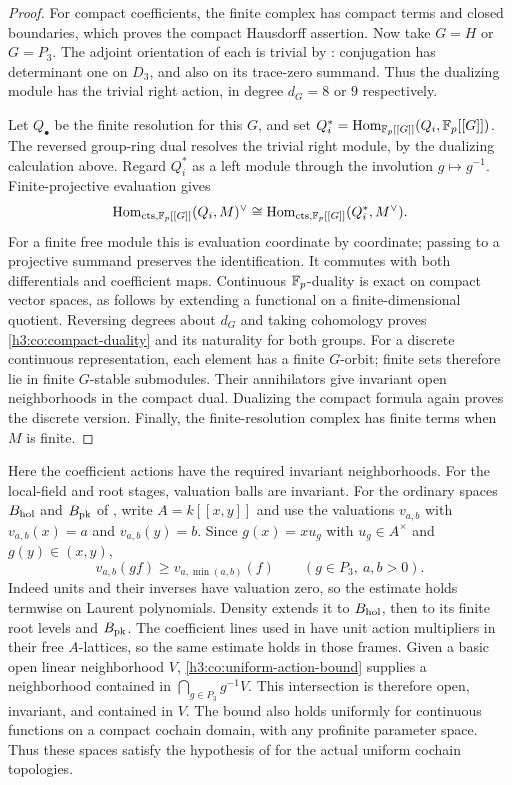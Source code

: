 \begin{proof}
For compact coefficients, the finite complex has compact terms and
closed boundaries, which proves the compact Hausdorff assertion.
Now take $G=H$ or $G=P_3$.  The adjoint orientation of each is trivial
by : conjugation has determinant one on
$D_3$, and also on its trace-zero summand.  Thus the dualizing module
has the trivial right action, in degree $d_G=8$ or $9$ respectively.

Let $Q_\bullet$ be the finite resolution for this $G$, and set
$Q_i^*=\operatorname{Hom}_{\mathbb F_p[[G]]}(Q_i,\mathbb F_p[[G]])$.
The reversed group-ring dual resolves the trivial right module, by
the dualizing calculation above.  Regard $Q_i^*$ as a left module
through the involution $g\mapsto g^{-1}$.  Finite-projective evaluation
gives
\[
 \operatorname{Hom}_{\mathrm{cts},\mathbb F_p[[G]]}(Q_i,M)^\vee
 \cong
 \operatorname{Hom}_{\mathrm{cts},\mathbb F_p[[G]]}(Q_i^*,M^\vee).
\]
For a finite free module this is evaluation coordinate by coordinate;
passing to a projective summand preserves the identification.  It
commutes with both differentials and coefficient maps.  Continuous
$\mathbb F_p$-duality is exact on compact vector spaces, as follows by extending
a functional on a finite-dimensional quotient.  Reversing degrees about
$d_G$ and taking cohomology proves \eqref{h3:co:compact-duality} and its
naturality for both groups.  For a discrete continuous representation,
each element has a finite $G$-orbit; finite sets therefore lie in finite
$G$-stable submodules.  Their annihilators give invariant open
neighborhoods in the compact dual.  Dualizing the compact formula again
proves the discrete version.  Finally, the finite-resolution complex
has finite terms when $M$ is finite.
\end{proof}

Here the coefficient actions have the required invariant neighborhoods.
For the local-field and root stages, valuation balls are invariant.
For the ordinary spaces $B_{\mathrm{hol}}$ and $B_{\mathrm{pk}}$ of
, write $A=k[[x,y]]$ and use the valuations
$v_{a,b}$ with $v_{a,b}(x)=a$ and $v_{a,b}(y)=b$.  Since
$g(x)=xu_g$ with $u_g\in A^\times$ and $g(y)\in(x,y)$,
\begin{equation}\label{h3:co:uniform-action-bound}
 v_{a,b}(gf)\geq v_{a,\min(a,b)}(f)
 \qquad(g\in P_3,\ a,b>0).
\end{equation}
Indeed units and their inverses have valuation zero, so the estimate
holds termwise on Laurent polynomials.  Density extends it to
$B_{\mathrm{hol}}$, then to its finite root levels and $B_{\mathrm{pk}}$.
The coefficient lines used in  have unit action
multipliers in their free $A$-lattices, so the same estimate holds
in those frames.  Given a basic open linear neighborhood $V$,
\eqref{h3:co:uniform-action-bound} supplies a neighborhood contained in
$\bigcap_{g\in P_3}g^{-1}V$.  This intersection is therefore open,
invariant, and contained in $V$.  The bound also holds uniformly for
continuous functions on a compact cochain domain, with any profinite
parameter space.  Thus these spaces satisfy the hypothesis of
 for the actual uniform cochain topologies.

